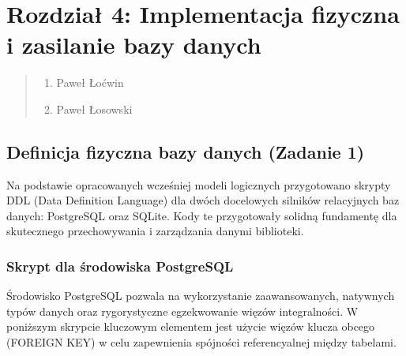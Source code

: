 \documentclass[letterpaper,10pt,english]{sphinxmanual}
\begin{document}
\chapter{Rozdział 4: Implementacja fizyczna i zasilanie bazy danych}
\label{\detokenize{rozdzial_4/index:rozdzial-4-implementacja-fizyczna-i-zasilanie-bazy-danych}}\label{\detokenize{rozdzial_4/index::doc}}\begin{quote}\begin{description}
\begin{enumerate}
%
\item {} 
\sphinxAtStartPar
Paweł Łoćwin

\item {} 
\sphinxAtStartPar
Paweł Łosowski

\end{enumerate}

\end{description}\end{quote}


\section{Definicja fizyczna bazy danych (Zadanie 1)}
\label{\detokenize{rozdzial_4/index:definicja-fizyczna-bazy-danych-zadanie-1}}
\sphinxAtStartPar
Na podstawie opracowanych wcześniej modeli logicznych przygotowano skrypty DDL (Data Definition Language) dla dwóch docelowych silników relacyjnych baz danych: PostgreSQL oraz SQLite. Kody te przygotowały solidną fundamentę dla skutecznego przechowywania i zarządzania danymi biblioteki.


\subsection{Skrypt dla środowiska PostgreSQL}
\label{\detokenize{rozdzial_4/index:skrypt-dla-srodowiska-postgresql}}
\sphinxAtStartPar
Środowisko PostgreSQL pozwala na wykorzystanie zaawansowanych, natywnych typów danych oraz rygorystyczne egzekwowanie więzów integralności. W poniższym skrypcie kluczowym elementem jest użycie więzów klucza obcego (FOREIGN KEY) w celu zapewnienia spójności referencyalnej między tabelami.
\end{document}
